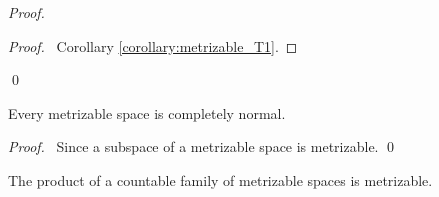\begin{proof}
    \pf
    \begin{proof}
        \pf\ Corollary \ref{corollary:metrizable_T1}.
    \end{proof}
    \qed
\end{proof}

\begin{corollary}
    Every metrizable space is completely normal.
\end{corollary}

\begin{proof}
    \pf\ Since a subspace of a metrizable space is metrizable. \qed
\end{proof}

\begin{proposition}[CC]
    The product of a countable family of metrizable spaces is metrizable.
\end{proposition}

